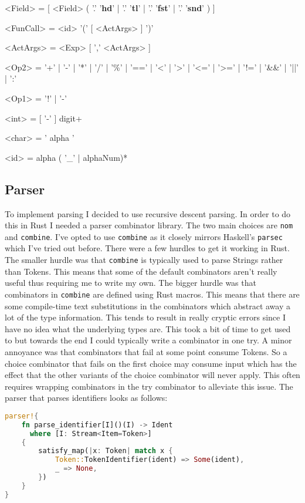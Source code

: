 \documentclass{article}
\begin{document}
\begin{grammar}
	<Field> = [ <Field> ( '.' '\textbf{hd}' | '.' '\textbf{tl}' | '.' '\textbf{fst}' | '.' '\textbf{snd}' ) ]

	<FunCall> = <id> '(' [ <ActArgs> ] ')'

	<ActArgs> = <Exp> [ ',' <ActArgs> ]

	<Op2> = '+' | '-' | '*' | '/' | '\%' | '==' | '\textless' | '\textgreater' | '\textless=' | '\textgreater=' | '!=' | '\&\&' | '||' | ':'

	<Op1> = '!' | '-'

	<int> = [ '-' ] digit+

	<char> = ' alpha '

	<id> = alpha ( '\_' | alphaNum)*
\end{grammar}

\subsection{Parser}
To implement parsing I decided to use recursive descent parsing. In order to do this in Rust I needed a parser combinator library. The two main choices are \texttt{nom} and \texttt{combine}. I've opted to use \texttt{combine} as it closely mirrors Haskell's \texttt{parsec} which I've tried out before. There were a few hurdles to get it working in Rust. The smaller hurdle was that \texttt{combine} is typically used to parse Strings rather than Tokens. This means that some of the default combinators aren't really useful thus requiring me to write my own. The bigger hurdle was that combinators in \texttt{combine} are defined using Rust macros. This means that there are some compile-time text substitutions in the combinators which abstract away a lot of the type information. This tends to result in really cryptic errors since I have no idea what the underlying types are. This took a bit of time to get used to but towards the end I could typically write a combinator in one try. A minor annoyance was that combinators that fail at some point consume Tokens. So a choice combinator that fails on the first choice may consume input which has the effect that the other variants of the choice combinator will never apply. This often requires wrapping combinators in the try combinator to alleviate this issue. The parser that parses identifiers looks as follows:
\begin{lstlisting}[language=Rust, style=boxed]
parser!{
	fn parse_identifier[I]()(I) -> Ident
	  where [I: Stream<Item=Token>]
	{
		satisfy_map(|x: Token| match x {
			Token::TokenIdentifier(ident) => Some(ident),
			_ => None,
		})
	}
}
\end{lstlisting}
\end{document}
